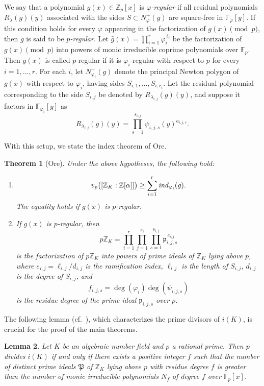 \documentclass[table]{amsart}
\newtheorem{theorem}{Theorem}[section]
\newtheorem{lemma}[theorem]{Lemma}
\newcommand{\Z}{\mathbb{Z}}
\newcommand{\F}{\mathbb{F}}
\numberwithin{equation}{section}
\begin{document}
We say that a polynomial $g(x)\in\Z_p[x]$ is \emph{$\varphi$-regular} if all residual polynomials
$R_\lambda(g)(y)$ associated with the sides $S\subset N_\varphi^+(g)$ are square-free in
$\F_\varphi[y]$. If this condition holds for every $\varphi$ appearing in the factorization
of $g(x)\pmod p$, then $g$ is said to be \emph{$p$-regular}.
Let $\bar g(x)=\prod_{i=1}^r \bar\varphi_i^{\,\ell_i}$
be the factorization of $g(x)\pmod p$ into powers of monic irreducible coprime polynomials
over $\F_p$. Then $g(x)$ is called $p$-regular if it is $\varphi_i$-regular with respect to $p$
for every $i=1,\dots,r$.
For each $i$, let $N_{\varphi_i}^+(g)$ denote the principal Newton polygon of $g(x)$ with respect
to $\varphi_i$, having sides $S_{i,1},\dots,S_{i,r_i}$.
Let the residual polynomial corresponding to the side $S_{i,j}$ be denoted by
$R_{\lambda_{i,j}}(g)(y)$, and suppose it factors in $\F_{\varphi_i}[y]$ as
\[
R_{\lambda_{i,j}}(g)(y)=\prod_{s=1}^{s_{i,j}} \psi_{i,j,s}(y)^{a_{i,j,s}}.
\]

With this setup, we state the index theorem of Ore.

\begin{theorem}[Ore]\label{thm:Ore}
{\cite[Theorems~1.7 and~1.9]{EFMN12}}
Under the above hypotheses, the following hold:
\begin{enumerate}
\item
\[
v_p\bigl([\Z_K:\Z[\alpha]]\bigr)\ge
\sum_{i=1}^r \it{ind}_{\varphi_i}(g).
\]
The equality holds if $g(x)$ is $p$-regular.

\item
If $g(x)$ is $p$-regular, then
\[
p\Z_K=\prod_{i=1}^r \prod_{j=1}^{r_i} \prod_{s=1}^{s_{i,j}} \mathfrak{p}_{i,j,s}^{\,e_{i,j}}
\]
is the factorization of $p\Z_K$ into powers of prime ideals of $\Z_K$ lying above $p$, where
$e_{i,j}=\ell_{i,j}/d_{i,j}$ is the ramification index, $\ell_{i,j}$ is the length of $S_{i,j}$,
$d_{i,j}$ is the degree of $S_{i,j}$, and
\[
f_{i,j,s}=\deg(\varphi_i)\deg(\psi_{i,j,s})
\]
is the residue degree of the prime ideal $\mathfrak{p}_{i,j,s}$ over $p$.
\end{enumerate}
\end{theorem}

The following lemma (cf.~\cite{Hen94}), which characterizes the prime divisors of $i(K)$,
is crucial for the proof of the main theorems.

\begin{lemma}\label{lem:index}
Let $K$ be an algebraic number field and $p$ a rational prime.
Then $p$ divides $i(K)$ if and only if there exists a positive integer $f$ such that the number
of distinct prime ideals $\mathfrak{P}$ of $\Z_K$ lying above $p$ with residue degree $f$
is greater than the number of monic irreducible polynomials $N_f$ of degree $f$ over $\F_p[x]$.
\end{lemma}
\end{document}
